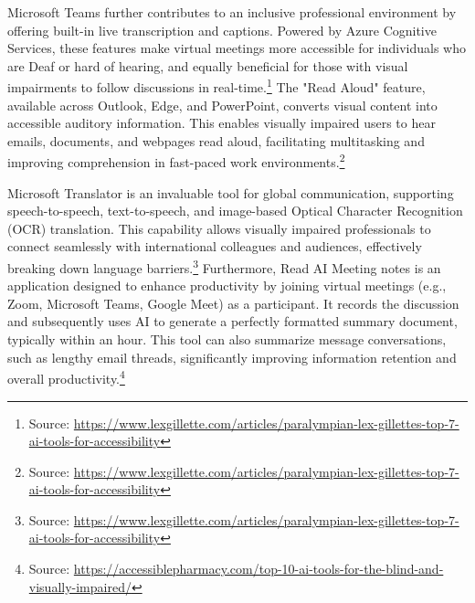 Microsoft Teams further contributes to an inclusive professional environment by offering built-in live transcription and captions. Powered by Azure Cognitive Services, these features make virtual meetings more accessible for individuals who are Deaf or hard of hearing, and equally beneficial for those with visual impairments to follow discussions in real-time.\footnote{Source: \url{https://www.lexgillette.com/articles/paralympian-lex-gillettes-top-7-ai-tools-for-accessibility}} The "Read Aloud" feature, available across Outlook, Edge, and PowerPoint, converts visual content into accessible auditory information. This enables visually impaired users to hear emails, documents, and webpages read aloud, facilitating multitasking and improving comprehension in fast-paced work environments.\footnote{Source: \url{https://www.lexgillette.com/articles/paralympian-lex-gillettes-top-7-ai-tools-for-accessibility}}

Microsoft Translator is an invaluable tool for global communication, supporting speech-to-speech, text-to-speech, and image-based Optical Character Recognition (OCR) translation. This capability allows visually impaired professionals to connect seamlessly with international colleagues and audiences, effectively breaking down language barriers.\footnote{Source: \url{https://www.lexgillette.com/articles/paralympian-lex-gillettes-top-7-ai-tools-for-accessibility}} Furthermore, Read AI Meeting notes is an application designed to enhance productivity by joining virtual meetings (e.g., Zoom, Microsoft Teams, Google Meet) as a participant. It records the discussion and subsequently uses AI to generate a perfectly formatted summary document, typically within an hour. This tool can also summarize message conversations, such as lengthy email threads, significantly improving information retention and overall productivity.\footnote{Source: \url{https://accessiblepharmacy.com/top-10-ai-tools-for-the-blind-and-visually-impaired/}}

